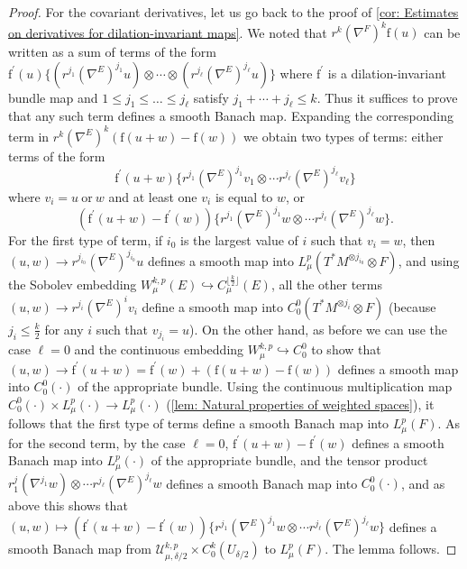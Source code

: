 \documentclass{article}
\numberwithin{equation}{section}        %
\theoremstyle{bfnote}
\theoremstyle{definition}
\theoremstyle{bfremark}
\newcommand{\bmap}[1]{\boldsymbol{\mathrm{#1}}}     %
\begin{document}
\begin{proof}
    For the covariant derivatives, let us go back to the proof of \cref{cor: Estimates on derivatives for dilation-invariant maps}. We noted that $r^k (\nabla^F)^k \bmap{f}(u)$ can be written as a sum of terms of the form $\bmap{f}^\prime(u) \{ (r^{j_1} (\nabla^E)^{j_1} u) \otimes \cdots \otimes (r^{j_\ell}(\nabla^E)^{j_\ell} u)\}$ where $\bmap{f}^\prime$ is a dilation-invariant bundle map and $1 \leq j_1 \leq \ldots \leq j_\ell$ satisfy $j_1 + \cdots + j_\ell \leq k$. Thus it suffices to prove that any such term defines a smooth Banach map. Expanding the corresponding term in $r^k (\nabla^E)^k (\bmap{f}(u+w)-\bmap{f}(w))$ we obtain two types of terms: either terms of the form
    \begin{equation*}
    	\bmap{f}^\prime(u+w) \{r^{j_1} (\nabla^E)^{j_1} v_1 \otimes \cdots r^{j_\ell} (\nabla^E)^{j_\ell} v_\ell\}
    \end{equation*}
    where $v_i = u ~ \text{or} ~ w$ and at least one $v_i$ is equal to $w$, or
    \begin{equation*}
    	(\bmap{f}^\prime(u+w)-\bmap{f}^\prime(w))\{ r^{j_1} (\nabla^E)^{j_1} w \otimes \cdots r^{j_\ell} (\nabla^E)^{j_\ell} w\} .
    \end{equation*}
    For the first type of term, if $i_0$ is the largest value of $i$ such that $v_i = w$, then $(u,w) \to r^{j_{i_0}} (\nabla^E)^{j_{i_0}} u$ defines a smooth map into $L^p_\mu(T^*M^{\otimes j_{i_0}} \otimes F)$, and using the Sobolev embedding $W^{k,p}_\mu(E) \hookrightarrow C^{\lfloor \frac{k}{2}\rfloor}_\mu(E)$, all the other terms $(u,w) \to r^{j_i} (\nabla^E)^i v_i$ define a smooth map into $C^0_0(T^* M^{\otimes j_i} \otimes F)$ (because $j_i \leq \frac{k}{2}$ for any $i$ such that $v_{j_i} = u$). On the other hand, as before we can use the case $\ell = 0$ and the continuous embedding $W^{k,p}_\mu \hookrightarrow C^0_0$ to show that $(u,w) \to \bmap{f}^\prime(u+w) = \bmap{f}^\prime(w) + (\bmap{f}(u+w)-\bmap{f}(w))$ defines a smooth map into $C^0_0(\cdot)$ of the appropriate bundle. Using the continuous multiplication map $C^{0}_0(\cdot) \times L^p_\mu(\cdot) \to L^p_\mu(\cdot)$ (\cref{lem: Natural properties of weighted spaces}), it follows that the first type of terms define a smooth Banach map into $L^p_\mu(F)$. As for the second term, by the case $\ell = 0$, $\bmap{f}^\prime(u+w)-\bmap{f}^\prime(w)$ defines a smooth Banach map into $L^p_\mu(\cdot)$ of the appropriate bundle, and the tensor product $r^j_1 (\nabla^{j_1} w) \otimes \cdots r^{j_\ell} (\nabla^E)^{j_\ell} w$ defines a smooth Banach map into $C^0_0(\cdot)$, and as above this shows that $(u,w) \mapsto (\bmap{f}^\prime(u+w)-\bmap{f}^\prime(w))\{ r^{j_1} (\nabla^E)^{j_1} w \otimes \cdots r^{j_\ell} (\nabla^E)^{j_\ell} w\}$ defines a smooth Banach map from $\mathcal{U}^{k,p}_{\mu,\delta/2} \times C^{k}_0(U_{\delta/2})$ to $L^p_\mu(F)$. The lemma follows.
\end{proof}
\end{document}
